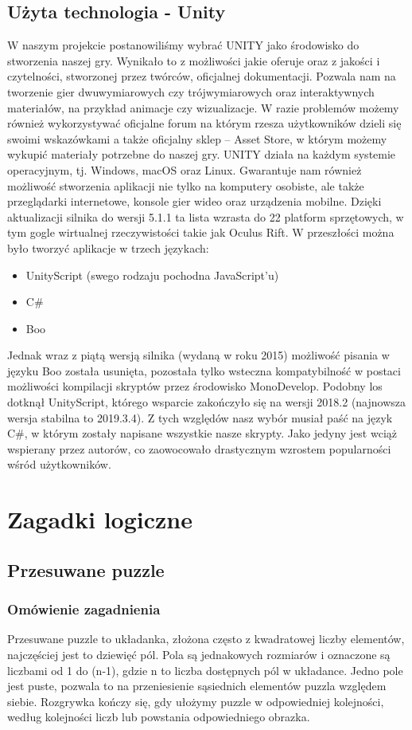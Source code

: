 \documentclass[oneside,polski,logo]{amuthesis}
\begin{document}
\section{Użyta technologia - Unity}
 W naszym projekcie postanowiliśmy wybrać UNITY jako środowisko do stworzenia naszej gry. Wynikało to z możliwości jakie oferuje oraz z jakości i czytelności, stworzonej przez twórców, oficjalnej dokumentacji. Pozwala nam na tworzenie gier dwuwymiarowych czy trójwymiarowych oraz interaktywnych materiałów, na przykład animacje czy wizualizacje. W razie problemów możemy również wykorzystywać oficjalne forum na którym rzesza użytkowników dzieli się swoimi wskazówkami a także oficjalny sklep – Asset Store, w którym możemy wykupić materiały potrzebne do naszej gry. UNITY działa na każdym systemie operacyjnym, tj. Windows, macOS oraz Linux. Gwarantuje nam również możliwość stworzenia aplikacji nie tylko na komputery osobiste, ale także przeglądarki internetowe, konsole gier wideo oraz urządzenia mobilne. Dzięki aktualizacji silnika do wersji 5.1.1 ta lista wzrasta do 22 platform sprzętowych, w tym gogle wirtualnej rzeczywistości takie jak Oculus Rift.
W przeszłości można było tworzyć aplikacje w trzech językach:
\begin{itemize}
	\item UnityScript (swego rodzaju pochodna JavaScript’u)
	\item C\#
	\item Boo
\end{itemize}
Jednak wraz z piątą wersją silnika (wydaną w roku 2015) możliwość pisania w języku Boo została usunięta, pozostała tylko wsteczna kompatybilność w postaci możliwości kompilacji skryptów przez środowisko MonoDevelop. Podobny los dotknął UnityScript, którego wsparcie zakończyło się na wersji 2018.2 (najnowsza wersja stabilna to 2019.3.4). Z tych względów nasz wybór musiał paść na język C\#, w którym zostały napisane wszystkie nasze skrypty. Jako jedyny jest wciąż wspierany przez autorów, co zaowocowało drastycznym wzrostem popularności wśród użytkowników.

\chapter{Zagadki logiczne}
\section{Przesuwane puzzle}
\subsection{Omówienie zagadnienia}
Przesuwane puzzle to układanka, złożona często z kwadratowej liczby elementów, najczęściej jest to dziewięć pól. Pola są jednakowych rozmiarów i oznaczone są liczbami od 1 do (n-1), gdzie n to liczba dostępnych pól w układance. Jedno pole jest puste, pozwala to na przeniesienie sąsiednich elementów puzzla względem siebie. Rozgrywka kończy się, gdy ułożymy puzzle w odpowiedniej kolejności, według kolejności liczb lub powstania odpowiedniego obrazka.
\end{document}
